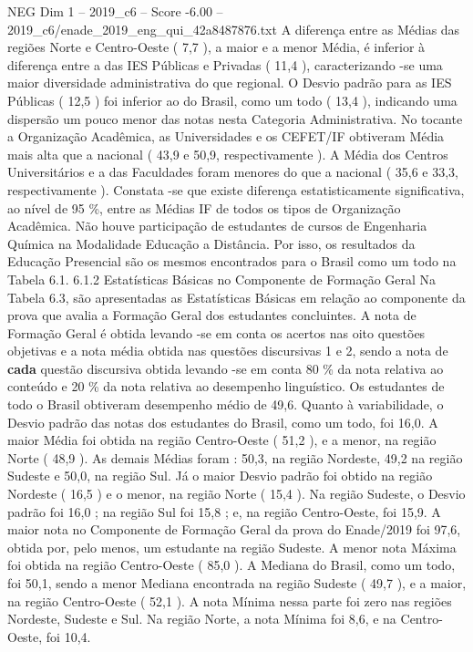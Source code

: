\begin{textsample}{NEG Dim 1 – 2019\_c6 – Score -6.00 – 2019\_c6/enade\_2019\_eng\_qui\_42a8487876.txt}
A diferença entre as Médias das regiões Norte e Centro-Oeste ( 7,7 ), a maior e a menor Média, é inferior à diferença entre a das IES Públicas e Privadas ( 11,4 ), caracterizando -se uma maior diversidade administrativa do que regional.
O Desvio padrão para as IES Públicas ( 12,5 ) foi inferior ao do Brasil, como um todo ( 13,4 ), indicando uma dispersão um pouco menor das notas nesta Categoria Administrativa.
No tocante a Organização Acadêmica, as Universidades e os CEFET/IF obtiveram Média mais alta que a nacional ( 43,9 e 50,9, respectivamente ).
A Média dos Centros Universitários e a das Faculdades foram menores do que a nacional ( 35,6 e 33,3, respectivamente ).
Constata -se que existe diferença estatisticamente significativa, ao nível de 95 \%, entre as Médias IF de todos os tipos de Organização Acadêmica.
Não houve participação de estudantes de cursos de Engenharia Química na Modalidade Educação a Distância.
Por isso, os resultados da Educação Presencial são os mesmos encontrados para o Brasil como um todo na Tabela 6.1. 6.1.2 Estatísticas Básicas no Componente de Formação Geral Na Tabela 6.3, são apresentadas as Estatísticas Básicas em relação ao componente da prova que avalia a Formação Geral dos estudantes concluintes.
A nota de Formação Geral é obtida levando -se em conta os acertos nas oito questões objetivas e a nota média obtida nas questões discursivas 1 e 2, sendo a nota de \textbf{cada} questão discursiva obtida levando -se em conta 80 \% da nota relativa ao conteúdo e 20 \% da nota relativa ao desempenho linguístico.
Os estudantes de todo o Brasil obtiveram desempenho médio de 49,6.
Quanto à variabilidade, o Desvio padrão das notas dos estudantes do Brasil, como um todo, foi 16,0.
A maior Média foi obtida na região Centro-Oeste ( 51,2 ), e a menor, na região Norte ( 48,9 ).
As demais Médias foram : 50,3, na região Nordeste, 49,2 na região Sudeste e 50,0, na região Sul.
Já o maior Desvio padrão foi obtido na região Nordeste ( 16,5 ) e o menor, na região Norte ( 15,4 ).
Na região Sudeste, o Desvio padrão foi 16,0 ; na região Sul foi 15,8 ; e, na região Centro-Oeste, foi 15,9.
A maior nota no Componente de Formação Geral da prova do Enade/2019 foi 97,6, obtida por, pelo menos, um estudante na região Sudeste.
A menor nota Máxima foi obtida na região Centro-Oeste ( 85,0 ).
A Mediana do Brasil, como um todo, foi 50,1, sendo a menor Mediana encontrada na região Sudeste ( 49,7 ), e a maior, na região Centro-Oeste ( 52,1 ).
A nota Mínima nessa parte foi zero nas regiões Nordeste, Sudeste e Sul.
Na região Norte, a nota Mínima foi 8,6, e na Centro-Oeste, foi 10,4.

\end{textsample}
